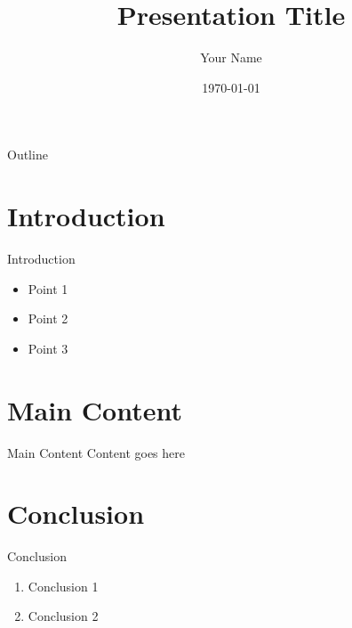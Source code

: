 \documentclass{beamer}
\title{Presentation Title}
\author{Your Name}
\institute{Your Institution}
\date{\today}
\begin{document}
\begin{frame}
\titlepage
\end{frame}

\begin{frame}{Outline}
\tableofcontents
\end{frame}

\section{Introduction}
\begin{frame}{Introduction}
\begin{itemize}
    \item Point 1
    \item Point 2
    \item Point 3
\end{itemize}
\end{frame}

\section{Main Content}
\begin{frame}{Main Content}
Content goes here
\end{frame}

\section{Conclusion}
\begin{frame}{Conclusion}
\begin{enumerate}
    \item Conclusion 1
    \item Conclusion 2
\end{enumerate}
\end{frame}
\end{document}
